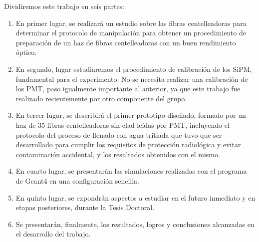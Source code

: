 Dividiremos este trabajo en seis partes:
\begin{enumerate}
\item{} En primer lugar, se realizará un estudio sobre las fibras centelleadoras para  determinar  el protocolo de manipulación para obtener un  procedimiento de preparación de  un haz de fibras centelleadoras con un buen rendimiento óptico. 

\item{} En segundo, lugar estudiaremos el procedimiento de calibración de los SiPM,  fundamental para el experimento.  No se necesita realizar una calibración de los PMT, paso igualmente importante al anterior, ya que este trabajo fue realizado recientemente por otro componente del grupo.

\item{} En tercer lugar, se describirá  el primer prototipo diseñado, formado por un haz de 35 fibras centelleadoras sin clad leídas por PMT,  incluyendo el protocolo del proceso de llenado con agua tritiada que tuvo que ser desarrollado para cumplir los requisitos de protección radiológica y evitar contaminación accidental,  y los  resultados obtenidos con el mismo.

\item{} En cuarto lugar, se presentarán las simulaciones realizadas con el programa de Geant4 en una configuración sencilla.

\item{} En quinto lugar, se expondrán aspectos a estudiar en el futuro inmediato y en etapas posteriores, durante la Tesis Doctoral. 


\item{} Se presentarán, finalmente, los resultados, logros y conclusiones alcanzadas en el desarrollo del  trabajo.

\end{enumerate}